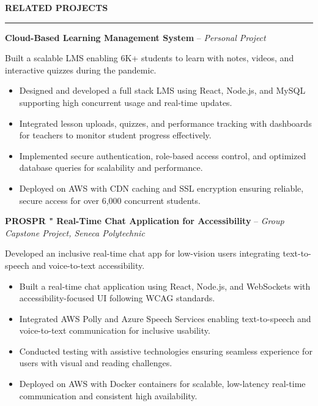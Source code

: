 \documentclass[10pt,letterpaper]{article}
\begin{document}
\vspace{6pt}

\textbf{RELATED PROJECTS}\\[-8pt]
\noindent\rule{\textwidth}{1pt}

\vspace{-2pt}

\textbf{Cloud-Based Learning Management System} -- \emph{Personal Project}

\vspace{-1pt}

Built a scalable LMS enabling 6K+ students to learn with notes, videos, and interactive quizzes during the pandemic.
\vspace{-1pt}
\begin{itemize}
\item Designed and developed a full stack LMS using React, Node.js, and MySQL supporting high concurrent usage and real-time updates.
\item Integrated lesson uploads, quizzes, and performance tracking with dashboards for teachers to monitor student progress effectively.
\item Implemented secure authentication, role-based access control, and optimized database queries for scalability and performance.
\item Deployed on AWS with CDN caching and SSL encryption ensuring reliable, secure access for over 6,000 concurrent students.
\end{itemize}

\textbf{PROSPR " Real-Time Chat Application for Accessibility} -- \emph{Group Capstone Project, Seneca Polytechnic}

\vspace{-1pt}

Developed an inclusive real-time chat app for low-vision users integrating text-to-speech and voice-to-text accessibility.
\vspace{-1pt}
\begin{itemize}
\item Built a real-time chat application using React, Node.js, and WebSockets with accessibility-focused UI following WCAG standards.
\item Integrated AWS Polly and Azure Speech Services enabling text-to-speech and voice-to-text communication for inclusive usability.
\item Conducted testing with assistive technologies ensuring seamless experience for users with visual and reading challenges.
\item Deployed on AWS with Docker containers for scalable, low-latency real-time communication and consistent high availability.
\end{itemize}
\end{document}
